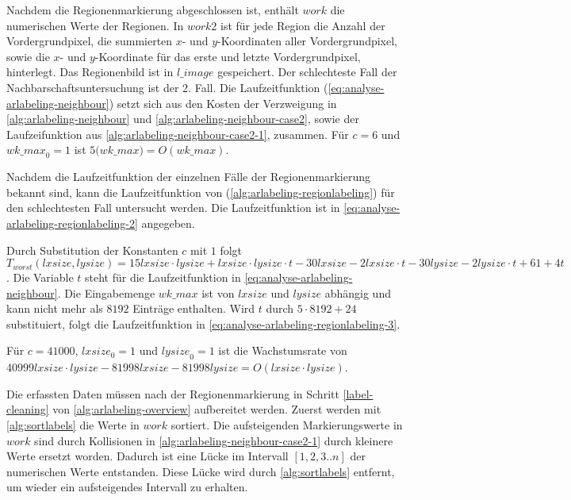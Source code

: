 Nachdem die Regionenmarkierung abgeschlossen ist, enthält $\mathit{work}$ die numerischen Werte der Regionen. In
 $\mathit{work2}$ ist für jede Region die Anzahl der Vordergrundpixel, die summierten $x$- und $y$-Koordinaten aller
 Vordergrundpixel, sowie die $x$- und $y$-Koordinate für das erste und letzte Vordergrundpixel, hinterlegt. Das
 Regionenbild ist in $\mathit{l\_image}$ gespeichert. Der schlechteste Fall der Nachbarschaftsuntersuchung ist der 2.
 Fall. Die Laufzeitfunktion (\autoref{eq:analyse-arlabeling-neighbour}) setzt sich aus den Kosten der Verzweigung in
 \autoref{alg:arlabeling-neighbour} und \autoref{alg:arlabeling-neighbour-case2}, sowie der Laufzeifunktion aus
 \autoref{alg:arlabeling-neighbour-case2-1}, zusammen. Für $c = 6$ und $\mathit{wk\_max}_{0} = 1$ ist
 $5 \mathit(wk\_max) = O(\mathit{wk\_max})$.


Nachdem die Laufzeitfunktion der einzelnen Fälle der Regionenmarkierung bekannt sind, kann die Laufzeitfunktion von
  (\autoref{alg:arlabeling-regionlabeling}) für den schlechtesten Fall untersucht werden. Die
 Laufzeitfunktion ist in \autoref{eq:analyse-arlabeling-regionlabeling-2} angegeben.

Durch Substitution der Konstanten $c$ mit $1$ folgt $T_{worst}(\mathit{lxsize},\mathit{lysize}) = 15 \mathit{lxsize}
 \cdot \mathit{lysize} + \mathit{lxsize} \cdot \mathit{lysize} \cdot t - 30 \mathit{lxsize} - 2 \mathit{lxsize} \cdot t
 -30 \mathit{lysize} - 2 \mathit{lysize} \cdot t + 61 + 4t$. Die Variable $t$ steht für die Laufzeitfunktion in
 \autoref{eq:analyse-arlabeling-neighbour}. Die Eingabemenge $\mathit{wk\_max}$ ist von $\mathit{lxsize}$ und
 $\mathit{lysize}$ abhängig und kann nicht mehr als $8192$ Einträge enthalten. Wird $t$ durch $5 \cdot 8192 + 24$
 substituiert, folgt die Laufzeitfunktion in \autoref{eq:analyse-arlabeling-regionlabeling-3}.

Für $c = 41000$, $\mathit{lxsize}_{0} = 1$ und $\mathit{lysize}_{0} = 1$ ist die Wachstumsrate von
 $40999\mathit{lxsize}\cdot\mathit{lysize} -81998\mathit{lxsize} -81998\mathit{lysize}
 = O(\mathit{lxsize}\cdot\mathit{lysize})$.

Die erfassten Daten müssen nach der Regionenmarkierung in Schritt \ref{label-cleaning} von
 \autoref{alg:arlabeling-overview} aufbereitet werden. Zuerst werden mit \autoref{alg:sortlabels} die Werte in
 $\mathit{work}$ sortiert. Die aufsteigenden Markierungswerte in $\mathit{work}$ sind durch Kollisionen in
 \autoref{alg:arlabeling-neighbour-case2-1} durch kleinere Werte ersetzt worden. Dadurch ist eine Lücke im Intervall
 $\left[1,2,3..n\right]$ der numerischen Werte entstanden. Diese Lücke wird durch \autoref{alg:sortlabels}
 entfernt, um wieder ein aufsteigendes Intervall zu erhalten.


